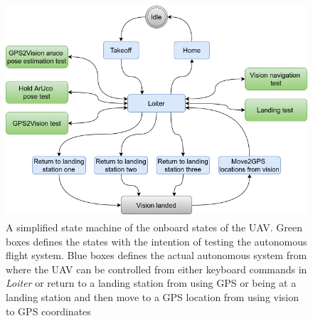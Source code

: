 \documentclass[../Head/report.tex]{subfiles}
\begin{document}
\begin{figure}[H]
    \centering
    \includegraphics[height=8.0cm]{../Figures/state_machine_state.png}
    \caption{A simplified state machine of the onboard states of the UAV. Green boxes defines the states with the intention of testing the autonomous flight system. Blue boxes defines the actual autonomous system from where the UAV can be controlled from either keyboard commands in \textit{Loiter} or return to a landing station from using GPS or being at a landing station and then move to a GPS location from using vision to GPS coordinates}
    \label{fig:state_machine_state}
\end{figure}
\end{document}
